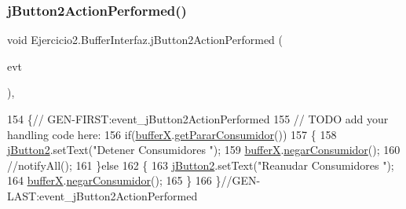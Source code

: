 \subsubsection{\texorpdfstring{j\+Button2\+Action\+Performed()}{jButton2ActionPerformed()}}
{\footnotesize\ttfamily void Ejercicio2.\+Buffer\+Interfaz.\+j\+Button2\+Action\+Performed (\begin{DoxyParamCaption}\item[{java.\+awt.\+event.\+Action\+Event}]{evt }\end{DoxyParamCaption})\hspace{0.3cm}{\ttfamily [inline]}, {\ttfamily [private]}}


\begin{DoxyCode}
154                                                                          \{\textcolor{comment}{//
      GEN-FIRST:event\_jButton2ActionPerformed}
155         \textcolor{comment}{// TODO add your handling code here:}
156         \textcolor{keywordflow}{if}(\mbox{\hyperlink{class_ejercicio2_1_1_buffer_interfaz_a53107ffeb83ad39dffdd24c9a407e67e}{bufferX}}.\mbox{\hyperlink{class_ejercicio2_1_1_buffer_aad0c2fc26ac6bedd2c027867f2026f32}{getPararConsumidor}}())
157         \{
158             \mbox{\hyperlink{class_ejercicio2_1_1_buffer_interfaz_a0c2d3a8ae39447836ea6faf16fb98ec3}{jButton2}}.setText(\textcolor{stringliteral}{"Detener Consumidores "});
159             \mbox{\hyperlink{class_ejercicio2_1_1_buffer_interfaz_a53107ffeb83ad39dffdd24c9a407e67e}{bufferX}}.\mbox{\hyperlink{class_ejercicio2_1_1_buffer_a9b87c49cad4ed9c88c5bfb48376bb8d4}{negarConsumidor}}();
160             \textcolor{comment}{//notifyAll();}
161         \}\textcolor{keywordflow}{else}
162         \{
163             \mbox{\hyperlink{class_ejercicio2_1_1_buffer_interfaz_a0c2d3a8ae39447836ea6faf16fb98ec3}{jButton2}}.setText(\textcolor{stringliteral}{"Reanudar Consumidores "});
164             \mbox{\hyperlink{class_ejercicio2_1_1_buffer_interfaz_a53107ffeb83ad39dffdd24c9a407e67e}{bufferX}}.\mbox{\hyperlink{class_ejercicio2_1_1_buffer_a9b87c49cad4ed9c88c5bfb48376bb8d4}{negarConsumidor}}();
165         \}
166     \}\textcolor{comment}{//GEN-LAST:event\_jButton2ActionPerformed}
\end{DoxyCode}
\mbox{\label{class_ejercicio2_1_1_buffer_interfaz_aeb77802d30bd769d914d0cd86698582e}} 
